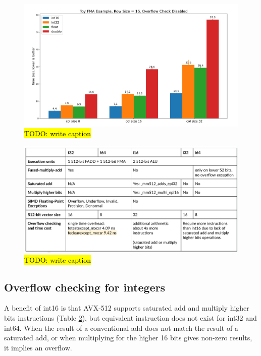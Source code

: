 \documentclass[logo,bsc,singlespacing,parskip]{infthesis}
\begin{document}
\begin{figure}
    \includegraphics[width=\linewidth]{image/col8-col16-col32-i16-i32-f32-f64.png}
    \caption{\hl{TODO: write caption}}
    \label{fig:col8-col16-col32-i16-i32-f32-f64}
\end{figure}

\begin{figure}\captionsetup{name=}
    \includegraphics[width=\linewidth]{image/arch-table.png}
    \caption{\hl{TODO: write caption}}
    \label{archtable}
\end{figure}

\subsection{Overflow checking for integers}

A benefit of int16 is that AVX-512 supports saturated add and multiply higher
bits instructions (Table \ref{archtable}), but equivalent instruction does not
exist for int32 and int64. When the result of a conventional add does not match
the result of a saturated add, or when multiplying for the higher 16 bits gives
non-zero results, it implies an overflow. 
\end{document}
